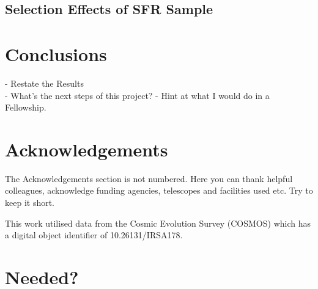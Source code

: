 \documentclass[fleqn,usenatbib]{mnras}
\begin{document}
\subsection{Selection Effects of SFR Sample}
 
\section{Conclusions}\label{conclusion}
 - Restate the Results \\
 - What's the next steps of this project?
    - Hint at what I would do in a Fellowship.
 
\section*{Acknowledgements}
The Acknowledgements section is not numbered. Here you can thank helpful
colleagues, acknowledge funding agencies, telescopes and facilities used etc.
Try to keep it short.

This work utilised data from the Cosmic Evolution Survey (COSMOS) which has a digital object identifier of 10.26131/IRSA178.







\appendix

\section{Needed?}




\bsp	%
\label{lastpage}
\end{document}
